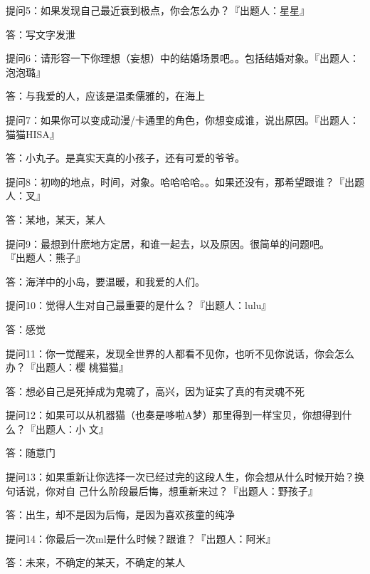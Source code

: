 		\vspace{1em}
		提问5：如果发现自己最近衰到极点，你会怎么办？『出题人：星星』\par
		答：写文字发泄

		\vspace{1em}
		提问6：请形容一下你理想（妄想）中的结婚场景吧。。包括结婚对象。『出题人：泡泡璐』\par
		答：与我爱的人，应该是温柔儒雅的，在海上

		\vspace{1em}
		提问7：如果你可以变成动漫/卡通里的角色，你想变成谁，说出原因。『出题人：猫猫HISA』\par
		答：小丸子。是真实天真的小孩子，还有可爱的爷爷。

		\vspace{1em}
		提问8：初吻的地点，时间，对象。哈哈哈哈。。如果还没有，那希望跟谁？『出题人：叉』\par
		答：某地，某天，某人

		\vspace{1em}
		提问9：最想到什麽地方定居，和谁一起去，以及原因。很简单的问题吧。\\『出题人：熊子』\par
		答：海洋中的小岛，要温暖，和我爱的人们。

		\vspace{1em}
		提问10：觉得人生对自己最重要的是什么？『出题人：lulu』\par
		答：感觉

		\vspace{1em}
		提问11：你一觉醒来，发现全世界的人都看不见你，也听不见你说话，你会怎么办？『出题人：樱
				桃猫猫』\par
		答：想必自己是死掉成为鬼魂了，高兴，因为证实了真的有灵魂不死

		\vspace{1em}
		提问12：如果可以从机器猫（也奏是哆啦A梦）那里得到一样宝贝，你想得到什么？『出题人：小
				文』\par
		答：随意门

		\vspace{1em}
		提问13：如果重新让你选择一次已经过完的这段人生，你会想从什么时候开始？换句话说，你对自
				己什么阶段最后悔，想重新来过？『出题人：野孩子』\par
		答：出生，却不是因为后悔，是因为喜欢孩童的纯净

		\vspace{1em}
		提问14：你最后一次ml是什么时候？跟谁？『出题人：阿米』\par
		答：未来，不确定的某天，不确定的某人

